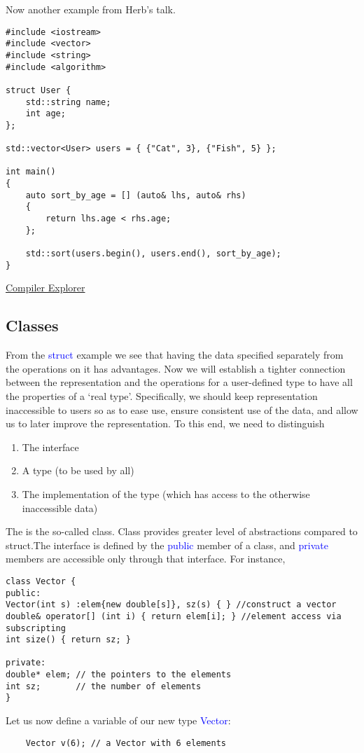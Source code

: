 \documentclass{article}
\newcommand{\be}[1]{\textcolor{blue}{#1}}
\begin{document}
Now another example from Herb's talk.
\begin{verbatim}
#include <iostream>
#include <vector>
#include <string>
#include <algorithm>

struct User {
    std::string name;
    int age;
};

std::vector<User> users = { {"Cat", 3}, {"Fish", 5} };

int main()
{
    auto sort_by_age = [] (auto& lhs, auto& rhs)
    {
        return lhs.age < rhs.age;
    };

    std::sort(users.begin(), users.end(), sort_by_age);
}
\end{verbatim}
\href{https://godbolt.org/z/noea68}{Compiler Explorer}

\subsection{Classes}
From the \be{struct} example we see that having the data specified separately from the operations on it 
has advantages. Now we will establish a tighter connection between the representation and the operations for a user-defined type to have all the properties of a `real type'. Specifically, we should keep representation inaccessible to users so as to ease use, ensure consistent use of the data, and allow us to later improve the representation. To this end, we need to distinguish
\begin{enumerate}
	\item The interface
	\item A type (to be used by all)
	\item The implementation of the type (which has access to the otherwise inaccessible data)
\end{enumerate}
The is the so-called class. Class provides greater level of abstractions compared to struct.The interface is defined by the \be{public} member of a class, and \be{private} members are accessible only through that interface. For instance,
\begin{verbatim}
class Vector {
public:
Vector(int s) :elem{new double[s]}, sz(s) { } //construct a vector
double& operator[] (int i) { return elem[i]; } //element access via subscripting
int size() { return sz; }

private:
double* elem; // the pointers to the elements
int sz;       // the number of elements	
}
\end{verbatim}
Let us now define a variable of our new type \be{Vector}:
\begin{verbatim}
	Vector v(6); // a Vector with 6 elements
\end{verbatim}
\end{document}
